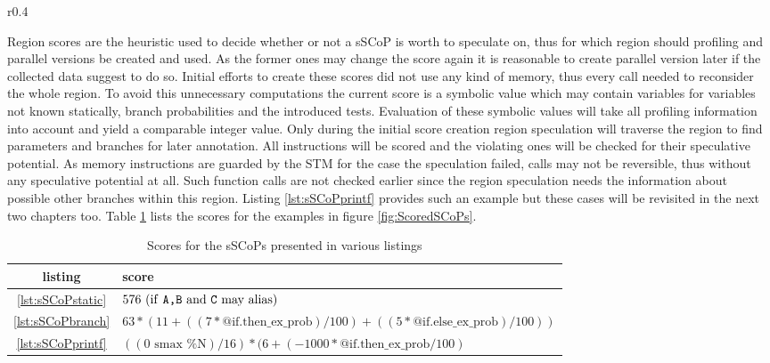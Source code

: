 \lstset{frame=none}
\begin{wrapfigure}[]{r}{0.4\textwidth}
  \centering


  \caption{example sSCoPs}
  \label{fig:ScoredSCoPs}
\end{wrapfigure}
\resetlst

Region scores are the heuristic used to decide whether or not a sSCoP is worth
to speculate on, thus for which region should profiling and parallel versions
be created and used. As the former ones may change the score again it is 
reasonable to create parallel version later if the collected data suggest to do
so. Initial efforts to create these scores did not use any kind of 
memory, thus every call needed to reconsider the whole region. To avoid this
unnecessary computations the current score is a symbolic value which may contain
variables for variables not known statically, branch probabilities and the 
introduced tests. Evaluation of these symbolic values will take all profiling
information into account and yield a comparable integer value. 
Only during the initial score creation region speculation will
traverse the region to find parameters and branches for later annotation.
All instructions will be scored and the violating ones
will be checked for their speculative potential.
As memory instructions are 
guarded by the STM for the case the speculation failed, calls may not be
reversible, thus without any speculative potential at all. Such function calls
are not checked earlier since the region speculation needs the information about
possible other branches within this region. Listing \ref{lst:sSCoPprintf} 
provides such an example but these cases will be revisited in the next 
two chapters too. Table \ref{tab:Scores} lists the scores for the examples in 
figure \ref{fig:ScoredSCoPs}. 


\begin{table}[htbp]
  \centering
  \caption{Scores for the sSCoPs presented in various listings}
  \begin{tabular}{ c l}
    listing & score \\
    \hline
    \ref{lst:sSCoPstatic} & $ 576 \hfill \text{  (if \texttt{A,B} and \texttt{C} may alias)} $ \\
    \ref{lst:sSCoPbranch} & $63 * (11 + ((7 * \text{@if.then\_ex\_prob}) / 100) + ((5 * \text{@if.else\_ex\_prob}) / 100)) $ \\
    \ref{lst:sSCoPprintf} & $((0\text{ smax }\%\text{N}) / 16) * (6 + (-1000 * \text{@if.then\_ex\_prob} / 100)$ \\
   \end{tabular}
  \label{tab:Scores}
\end{table}





